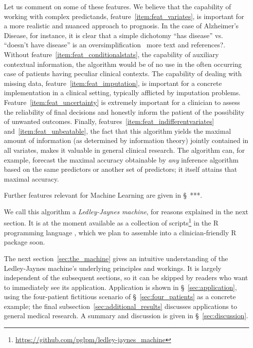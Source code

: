 \documentclass[utf8]{FrontiersinHarvard} %
\newcommand*{\pencil}{{\fontencoding{U}\fontfamily{fontawesometwo}\selectfont\symbol{210}}}
\newcommand{\mynotep}[1]{{\color{notecolour}\pencil\ #1}}
\newcommand*{\sect}{\S}%
\renewcommand*{\|}[1][]{\nonscript\:#1\vert\nonscript\:\mathopen{}}
\newcommand*{\ad}{Alzheimer's Disease}
\newcommand*{\ljm}{Ledley-Jaynes machine}
\begin{document}
Let us comment on some of these features. We believe that the capability of working with complex predictands, feature~\ref{item:feat_variates}, is important for a more realistic and nuanced approach to prognosis. In the case of \ad, for instance, it is clear that a simple dichotomy \enquote{has disease} vs. \enquote{doesn't have disease} is an oversimplification \mynotep{more text and references?}. Without feature~\ref{item:feat_conditionalstats}, the capability of auxiliary contextual information, the algorithm would be of no use in the often occurring case of patients having peculiar clinical contexts. The capability of dealing with missing data, feature~\ref{item:feat_imputation}, is important for a concrete implementation in a clinical setting, typically afflicted by imputation problems. Feature~\ref{item:feat_uncertainty} is extremely important for a clinician to assess the reliability of final decisions and honestly inform the patient of the possibility of unwanted outcomes. Finally, features~\ref{item:feat_indifferentvariates} and~\ref{item:feat_unbeatable}, the fact that this algorithm yields the maximal amount of information (as determined by information theory) jointly contained in all variates, makes it valuable in general clinical research. The algorithm can, for example, forecast the maximal accuracy obtainable by \emph{any} inference algorithm based on the same predictors or another set of predictors; it itself attains that maximal accuracy.

Further features relevant for Machine Learning are given in \sect\mynotep{***}.

We call this algorithm a \emph{\ljm}, for reasons explained in the next section. It is at the moment available as a collection of scripts\footnote{\url{https://github.com/pglpm/ledley-jaynes\_machine}} in the R programming language \citep{rcoreteam1995_r2023}, which we plan to assemble into a clinician-friendly R package soon.

The next section~\ref{sec:the_machine} gives an intuitive understanding of the \ljm's underlying principles and workings. It is largely independent of the subsequent sections, so it can be skipped by readers who want to immediately see its application. Application is shown in \sect~\ref{sec:application}, using the four-patient fictitious scenario of \sect~\ref{sec:four_patients} as a concrete example; the final subsection~\ref{sec:additional_results} discusses applications to general medical research. A summary and discussion is given in \sect~\ref{sec:discussion}.
\end{document}
